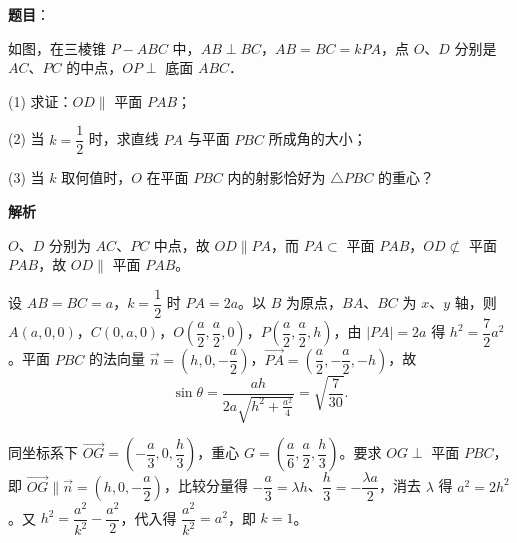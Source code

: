 \begin{answer}

\textbf{题目}：

如图，在三棱锥 $P - ABC$ 中，$AB \perp BC$，$AB = BC = kPA$，点 $O$、$D$ 分别是 $AC$、$PC$ 的中点，$OP \perp$ 底面 $ABC$．

(1) 求证：$OD \parallel$ 平面 $PAB$；

(2) 当 $k = \dfrac{1}{2}$ 时，求直线 $PA$ 与平面 $PBC$ 所成角的大小；

(3) 当 $k$ 取何值时，$O$ 在平面 $PBC$ 内的射影恰好为 $\triangle PBC$ 的重心？
\nopagebreak[4]
\begin{center}\end{center}
\nopagebreak[4]
\textbf{解析}


$O$、$D$ 分别为 $AC$、$PC$ 中点，故 $OD \parallel PA$，而 $PA \subset$ 平面 $PAB$，$OD \not\subset$ 平面 $PAB$，故 $OD \parallel$ 平面 $PAB$。


设 $AB = BC = a$，$k = \dfrac{1}{2}$ 时 $PA = 2a$。以 $B$ 为原点，$BA$、$BC$ 为 $x$、$y$ 轴，则 $A(a, 0, 0)$，$C(0, a, 0)$，$O\left(\dfrac{a}{2}, \dfrac{a}{2}, 0\right)$，$P\left(\dfrac{a}{2}, \dfrac{a}{2}, h\right)$，由 $|PA| = 2a$ 得 $h^2 = \dfrac{7}{2}a^2$。平面 $PBC$ 的法向量 $\vec{n} = (h, 0, -\dfrac{a}{2})$，$\overrightarrow{PA} = \left(\dfrac{a}{2}, -\dfrac{a}{2}, -h\right)$，故
\nopagebreak[4]
\[
\sin\theta = \frac{ah}{2a\sqrt{h^2 + \frac{a^2}{4}}} = \sqrt{\frac{7}{30}}.
\]


同坐标系下 $\overrightarrow{OG} = \left(-\dfrac{a}{3}, 0, \dfrac{h}{3}\right)$，重心 $G = \left(\dfrac{a}{6}, \dfrac{a}{2}, \dfrac{h}{3}\right)$。要求 $OG \perp$ 平面 $PBC$，即 $\overrightarrow{OG} \parallel \vec{n} = (h, 0, -\dfrac{a}{2})$，比较分量得 $-\dfrac{a}{3} = \lambda h$、$\dfrac{h}{3} = -\dfrac{\lambda a}{2}$，消去 $\lambda$ 得 $a^2 = 2h^2$。又 $h^2 = \dfrac{a^2}{k^2} - \dfrac{a^2}{2}$，代入得 $\dfrac{a^2}{k^2} = a^2$，即 $k = 1$。




\end{answer}

